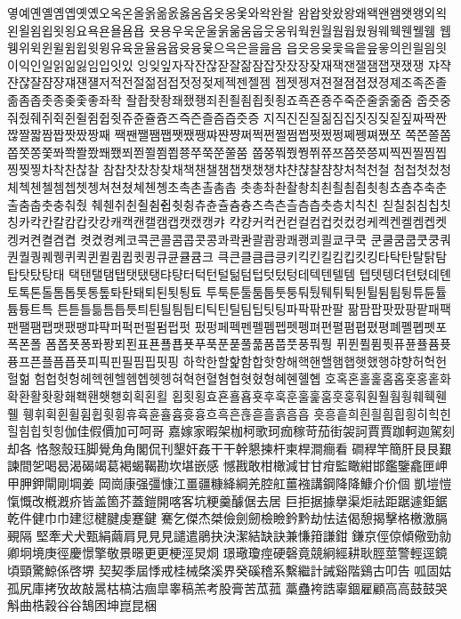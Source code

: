옇예옌옐옘옙옛옜오옥온올옭옮옰옳옴옵옷옹옻와왁완왈
왐왑왓왔왕왜왝왠왬왯왱외왹왼욀욈욉욋욍요욕욘욜욤욥
욧용우욱운울욹욺움웁웃웅워웍원월웜웝웠웡웨웩웬웰웸
웹웽위윅윈윌윔윕윗윙유육윤율윰윱윳융윷으윽은을읊음
읍읏응읒읓읔읕읖읗의읜읠읨읫이익인일읽읾잃임입잇있
잉잊잎자작잔잖잗잘잚잠잡잣잤장잦재잭잰잴잼잽잿쟀쟁
쟈쟉쟌쟎쟐쟘쟝쟤쟨쟬저적전절젊점접젓정젖제젝젠젤젬
젭젯젱져젼졀졈졉졌졍졔조족존졸졺좀좁좃종좆좇좋좌좍
좔좝좟좡좨좼좽죄죈죌죔죕죗죙죠죡죤죵주죽준줄줅줆줌
줍줏중줘줬줴쥐쥑쥔쥘쥠쥡쥣쥬쥰쥴쥼즈즉즌즐즘즙즛증
지직진짇질짊짐집짓징짖짙짚짜짝짠짢짤짧짬짭짯짰짱째
짹짼쨀쨈쨉쨋쨌쨍쨔쨘쨩쩌쩍쩐쩔쩜쩝쩟쩠쩡쩨쩽쪄쪘쪼
쪽쫀쫄쫌쫍쫏쫑쫓쫘쫙쫠쫬쫴쬈쬐쬔쬘쬠쬡쭁쭈쭉쭌쭐쭘
쭙쭝쭤쭸쭹쮜쮸쯔쯤쯧쯩찌찍찐찔찜찝찡찢찧차착찬찮찰
참찹찻찼창찾채책챈챌챔챕챗챘챙챠챤챦챨챰챵처척천철
첨첩첫첬청체첵첸첼쳄쳅쳇쳉쳐쳔쳤쳬쳰촁초촉촌촐촘촙
촛총촤촨촬촹최쵠쵤쵬쵭쵯쵱쵸춈추축춘출춤춥춧충춰췄
췌췐취췬췰췸췹췻췽츄츈츌츔츙츠측츤츨츰츱츳층치칙친
칟칠칡침칩칫칭카칵칸칼캄캅캇캉캐캑캔캘캠캡캣캤캥캬
캭컁커컥컨컫컬컴컵컷컸컹케켁켄켈켐켑켓켕켜켠켤켬켭
켯켰켱켸코콕콘콜콤콥콧콩콰콱콴콸쾀쾅쾌쾡쾨쾰쿄쿠쿡
쿤쿨쿰쿱쿳쿵쿼퀀퀄퀑퀘퀭퀴퀵퀸퀼큄큅큇큉큐큔큘큠크
큭큰클큼큽킁키킥킨킬킴킵킷킹타탁탄탈탉탐탑탓탔탕태
택탠탤탬탭탯탰탱탸턍터턱턴털턺텀텁텃텄텅테텍텐텔템
텝텟텡텨텬텼톄톈토톡톤톨톰톱톳통톺톼퇀퇘퇴퇸툇툉툐
투툭툰툴툼툽툿퉁퉈퉜퉤튀튁튄튈튐튑튕튜튠튤튬튱트특
튼튿틀틂틈틉틋틔틘틜틤틥티틱틴틸팀팁팃팅파팍팎판팔
팖팜팝팟팠팡팥패팩팬팰팸팹팻팼팽퍄퍅퍼퍽펀펄펌펍펏
펐펑페펙펜펠펨펩펫펭펴편펼폄폅폈평폐폘폡폣포폭폰폴
폼폽폿퐁퐈퐝푀푄표푠푤푭푯푸푹푼푿풀풂품풉풋풍풔풩
퓌퓐퓔퓜퓟퓨퓬퓰퓸퓻퓽프픈플픔픕픗피픽핀필핌핍핏핑
하학한할핥함합핫항해핵핸핼햄햅햇했행햐향허헉헌헐헒
험헙헛헝헤헥헨헬헴헵헷헹혀혁현혈혐협혓혔형혜혠혤혭
호혹혼홀홅홈홉홋홍홑화확환활홧황홰홱홴횃횅회획횐횔
횝횟횡효횬횰횹횻후훅훈훌훑훔훗훙훠훤훨훰훵훼훽휀휄
휑휘휙휜휠휨휩휫휭휴휵휸휼흄흇흉흐흑흔흖흗흘흙흠흡
흣흥흩희흰흴흼흽힁히힉힌힐힘힙힛힝伽佳假價加可呵哥
嘉嫁家暇架枷柯歌珂痂稼苛茄街袈訶賈賈跏軻迦駕刻却各
恪慤殼珏脚覺⾓角閣侃刊墾奸姦⼲干幹懇揀杆柬桿澗癎看
磵稈竿簡肝⾉艮艱諫間乫喝曷渴碣竭葛褐蝎鞨勘坎堪嵌感
憾戡敢柑橄減⽢甘疳監瞰紺邯鑑鑒龕匣岬甲胛鉀閘剛堈姜
岡崗康强彊慷江畺疆糠絳綱羌腔舡薑襁講鋼降降鱇介价個
凱塏愷愾慨改槪漑疥皆盖箇芥蓋鎧開喀客坑粳羹醵倨去居
巨拒据據擧渠炬祛距踞遽鉅鋸乾件健⼱巾建愆楗腱虔蹇鍵
騫乞傑杰桀儉劍劒檢瞼鈐黔劫怯迲偈憩揭擊格檄激膈覡隔
堅牽⽝犬甄絹繭肩⾒見見譴遣鵑抉決潔結缺訣兼慊箝謙鉗
鎌京俓倞傾儆勁勍卿坰境庚徑慶憬擎敬景暻更更梗涇炅烱
璟璥瓊痙硬磬竟競絅經耕耿脛莖警輕逕鏡頃頸驚鯨係啓堺
契契季屆悸戒桂械棨溪界癸磎稽系繫繼計誡谿階鷄古叩告
呱固姑孤尻庫拷攷故敲暠枯槁沽痼皐睾稿羔考股膏苦苽菰
藁蠱袴誥辜錮雇顧⾼高⿎鼓哭斛曲梏穀⾕谷鵠困坤崑昆梱
